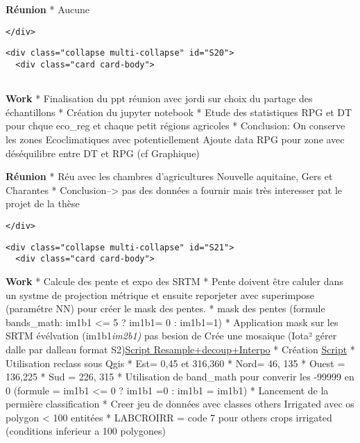 \documentclass[11pt]{article}
\begin{document}
\textbf{Réunion} * Aucune

\begin{verbatim}
</div>
\end{verbatim}

\begin{verbatim}
<div class="collapse multi-collapse" id="S20">
  <div class="card card-body">
      
\end{verbatim}

\textbf{Work} * Finalisation du ppt réunion avec jordi sur choix du
partage des échantillons * Création du jupyter notebook * Etude des
statistiques RPG et DT pour chque eco\_reg et chaque petit régions
agricoles * Conclusion: On conserve les zones Ecoclimatiques avec
potentiellement Ajoute data RPG pour zone avec déséquilibre entre DT et
RPG (cf Graphique)

\textbf{Réunion} * Réu avec les chambres d'agricultures Nouvelle
aquitaine, Gers et Charantes * Conclusion--\textgreater{} pas des
données a fournir mais très interesser pat le projet de la thèse

\begin{verbatim}
</div>
\end{verbatim}

\begin{verbatim}
<div class="collapse multi-collapse" id="S21">
  <div class="card card-body">
\end{verbatim}

\textbf{Work} * Calcule des pente et expo des SRTM * Pente doivent être
caluler dans un systme de projection métrique et ensuite reporjeter avec
superimpose (paramétre NN) pour créer le mask des pentes. * mask des
pentes (formule bands\_math: im1b1 \textless{}= 5 ? im1b1= 0 : im1b1=1)
* Application mask sur les SRTM évélvation (im1b1\emph{im2b1) } pas
besion de Crée une mosaique (Iota² gérer dalle par dalleau format
S2)\href{https://github.com/pageotyann/Code/blob/master/SCRIPT/python/SuperImpose_TILE_S2.py}{Script
Resample+decoup+Interpo} * Création
\href{https://github.com/pageotyann/Code/blob/master/SCRIPT/python/SRTM_PENTE_MASK.py}{Script}
* Utilisation reclass sous Qgis * Est= 0,45 et 316,360 * Nord= 46, 135 *
Ouest = 136,225 * Sud = 226, 315 * Utilisation de band\_math pour
converir les -99999 en 0 (formule = im1b1 \textless{}= 0 ? im1b1 =0 :
im1b1 = im1b1) * Lancement de la permière classification * Creer jeu de
données avec classes others Irrigated avec os polygon \textless{} 100
entitées * LABCROIRR = code 7 pour others crops irrigated (conditions
inferieur a 100 polygones)
\end{document}
